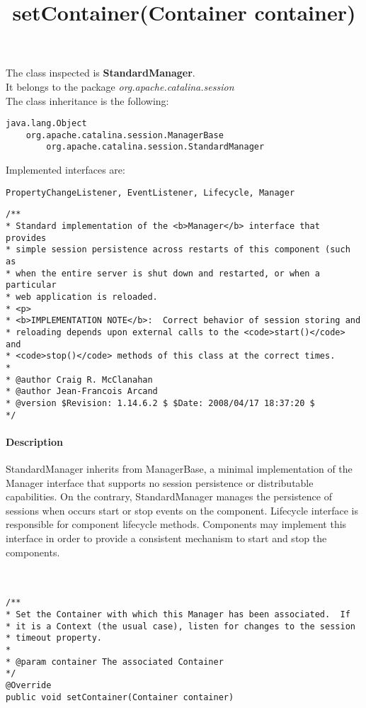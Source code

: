 The class inspected is \textbf{StandardManager}.\\It belongs to the package \textit{org.apache.catalina.session}\\
The class inheritance is the following:
\begin{verbatim}
java.lang.Object
    org.apache.catalina.session.ManagerBase
        org.apache.catalina.session.StandardManager
\end{verbatim}

Implemented interfaces are:
\begin{verbatim}
PropertyChangeListener, EventListener, Lifecycle, Manager
\end{verbatim}
\lstset{firstnumber=79}
\begin{lstlisting}
/**
* Standard implementation of the <b>Manager</b> interface that provides
* simple session persistence across restarts of this component (such as
* when the entire server is shut down and restarted, or when a particular
* web application is reloaded.
* <p>
* <b>IMPLEMENTATION NOTE</b>:  Correct behavior of session storing and
* reloading depends upon external calls to the <code>start()</code> and
* <code>stop()</code> methods of this class at the correct times.
*
* @author Craig R. McClanahan
* @author Jean-Francois Arcand
* @version $Revision: 1.14.6.2 $ $Date: 2008/04/17 18:37:20 $
*/
\end{lstlisting}
\paragraph{Description} StandardManager inherits from ManagerBase, a minimal implementation of the Manager interface that supports no session persistence or distributable capabilities. On the contrary, StandardManager manages the persistence of sessions when occurs start or stop events on the component. Lifecycle interface is responsible for component lifecycle methods. Components may implement this interface in order to provide a consistent mechanism to start and stop the components.\\\\\\



\title{{\large \textbf{setContainer(Container container)}}}
\lstset{firstnumber=245}
\begin{lstlisting}
/**
* Set the Container with which this Manager has been associated.  If
* it is a Context (the usual case), listen for changes to the session
* timeout property.
*
* @param container The associated Container
*/
@Override
public void setContainer(Container container)
\end{lstlisting}

